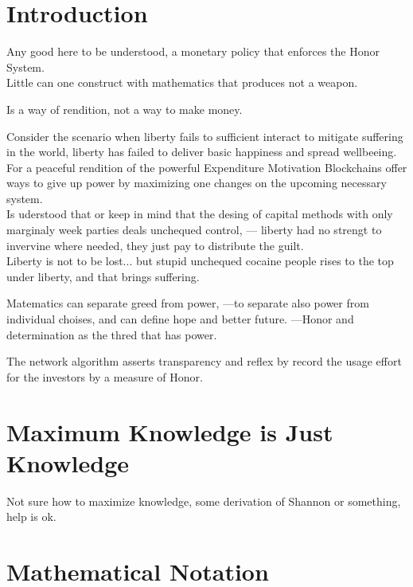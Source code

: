 \documentclass[a4paper,fleqn]{cas-sc}
\begin{document}
 \maketitle

\section{Introduction}
Any good here to be understood, a monetary policy that enforces the Honor System. \\

Little can one construct with mathematics that produces not a weapon. 

Is a way of rendition, not a way to make money. 

Consider the scenario when liberty fails to sufficient interact to mitigate suffering 
in the world, liberty has failed to deliver basic happiness and spread wellbeeing. 
For a peaceful rendition of the powerful Expenditure Motivation Blockchains offer 
ways to give up power by maximizing one changes on the upcoming necessary system. \\

Is uderstood that or keep in mind that the desing of capital methods with only marginaly 
week parties deals unchequed control, --- 
liberty had no strengt to invervine where needed, they just pay to distribute the guilt. \\

Liberty is not to be lost... but stupid unchequed cocaine people rises to the top under liberty, 
and that brings suffering. 

Matematics can separate greed from power, ---to separate also power from individual choises, 
and can define hope and better future. ---Honor and determination as the thred that has power. 

The network algorithm asserts transparency and reflex by record the usage effort for the 
investors by a measure of Honor.


\section{Maximum Knowledge is Just Knowledge}
Not sure how to maximize knowledge, some derivation of Shannon or something, help is ok. 

\section{Mathematical Notation}
\end{document}
